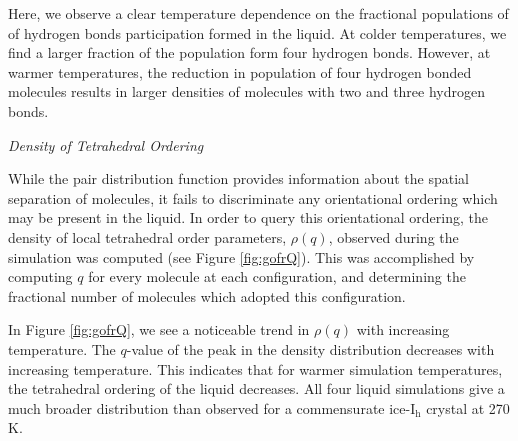 
Here, we observe a clear temperature dependence on the fractional
populations of of hydrogen bonds participation formed in the
liquid. At colder temperatures, we find a larger fraction of the
population form four hydrogen bonds. However, at warmer temperatures,
the reduction in population of four hydrogen bonded molecules results
in larger densities of molecules with two and three hydrogen bonds.



\begin{flushleft}
\textit{Density of Tetrahedral Ordering}
\end{flushleft}

While the pair distribution function provides information about
the spatial separation of molecules, it fails to discriminate any
orientational ordering which may be present in the liquid. In order to
query this orientational ordering, the density of local tetrahedral
order parameters, $\rho (q)$, observed during the simulation was
computed (see Figure \ref{fig:gofrQ}). This was accomplished by
computing $q$ for every molecule at each configuration, and determining
the fractional number of molecules which adopted this configuration.

In Figure \ref{fig:gofrQ}, we see a noticeable trend in $\rho (q)$
with increasing temperature. The $q$-value of the peak in the density
distribution decreases with increasing temperature. This indicates
that for warmer simulation temperatures, the tetrahedral ordering of
the liquid decreases. All four liquid simulations give a much broader
distribution than observed for a commensurate ice-I$_\mathrm{h}$
crystal at 270 K.





